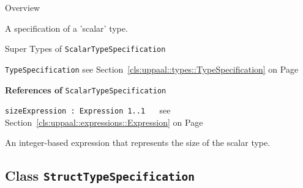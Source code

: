 	\begin{longdescription}
		\item[Overview] 		
				

	

		A specification of a 'scalar' type.		
		\item[Super Types of \texttt{ScalarTypeSpecification}] ~
			\begin{longdescription}
				\item[\texttt{TypeSpecification}] see Section~\ref{cls:uppaal::types::TypeSpecification} on Page~\pageref{cls:uppaal::types::TypeSpecification}						\end{longdescription}
		
	
			\item[\textbf{References of} \texttt{ScalarTypeSpecification}] ~
			\begin{longdescription}
	\item[\texttt{sizeExpression : Expression 	\symbol{"5B}1..1\symbol{"5D}
}] ~
	see Section~\ref{cls:uppaal::expressions::Expression} on Page~\pageref{cls:uppaal::expressions::Expression}
	
	\nopagebreak
		
				

	

		An integer-based expression that represents the size of the scalar type.		
			\end{longdescription}
	
	\end{longdescription}
	

\subsection{Class \bfseries \texttt{StructTypeSpecification}\normalfont}
\label{cls:uppaal::types::StructTypeSpecification} 
	
